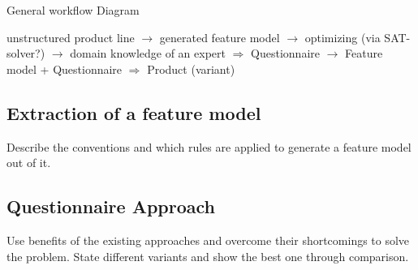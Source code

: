 General workflow Diagram

unstructured product line $\rightarrow$ generated feature model $\rightarrow$ optimizing (via SAT-solver?) $\rightarrow$ domain knowledge of an expert $\Rightarrow$ Questionnaire $\rightarrow$ Feature model + Questionnaire $\Rightarrow$ Product (variant)


\subsection{Extraction of a feature model}
Describe the conventions and which rules are applied to generate a feature model out of it.

\subsection{Questionnaire Approach}
Use benefits of the existing approaches and overcome their shortcomings to solve the problem. State different variants and show the best one through comparison.
